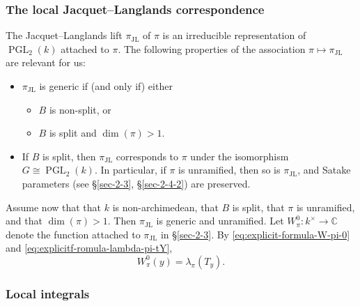\documentclass[reqno,10pt]{amsart}
\theoremstyle{plain} %
\theoremstyle{definition}
\theoremstyle{plain} %
\theoremstyle{remark}
\theoremstyle{itplain} %
\theoremstyle{remark} %
\numberwithin{equation}{section}
\DeclareMathOperator{\JL}{JL}
\def\PGL{\operatorname{PGL}}
\begin{document}
\subsubsection{The local Jacquet--Langlands correspondence}
\label{sec-2-4-3}
The Jacquet--Langlands lift $\pi_{\JL}$ of $\pi$ is an irreducible representation of $\PGL_2(k)$ attached to $\pi$.  The following properties of the association $\pi \mapsto \pi_{\JL}$ are relevant for us:
\begin{itemize}
\item $\pi_{\JL}$ is generic if (and only if) either
  \begin{itemize}
  \item $B$ is non-split, or
  \item $B$ is split and $\dim(\pi) > 1$.
  \end{itemize}
\item If $B$ is split, then $\pi_{\JL}$ corresponds to $\pi$ under the isomorphism $G \cong \PGL_2(k)$.  In particular, if $\pi$ is unramified, then so is $\pi_{\JL}$, and Satake parameters (see \S\ref{sec-2-3}, \S\ref{sec-2-4-2}) are preserved.
\end{itemize}
Assume now that that $k$ is non-archimedean, that $B$ is split, that $\pi$ is unramified, and that $\dim(\pi) > 1$.  Then $\pi_{\JL}$ is generic and unramified.
Let $W^0_\pi : k^\times \rightarrow \mathbb{C}$ denote the function attached to $\pi_{\JL}$ in \S\ref{sec-2-3}.  By \eqref{eq:explicit-formula-W-pi-0} and \eqref{eq:explicitf-romula-lambda-pi-tY},
\begin{equation}\label{eqn:key-local-identity-relating-whittaker-and-hecke}
  W_\pi^0(y) = \lambda_\pi(T_y).
\end{equation}

\subsubsection{Local integrals}
\label{sec:local-integrals-for-rallis-ipf}
\end{document}
